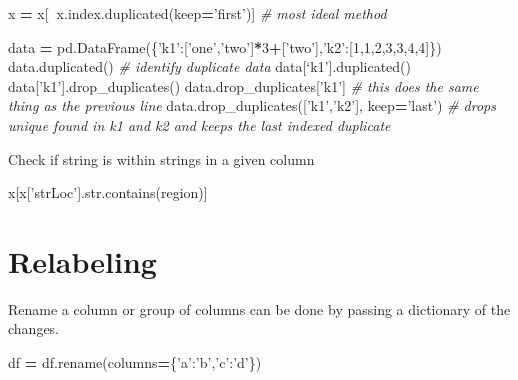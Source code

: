 \documentclass[]{book}
\newenvironment{Shaded}{\begin{snugshade}}{\end{snugshade}}
\newcommand{\DecValTok}[1]{\textcolor[rgb]{0.00,0.00,0.81}{#1}}
\newcommand{\StringTok}[1]{\textcolor[rgb]{0.31,0.60,0.02}{#1}}
\newcommand{\CommentTok}[1]{\textcolor[rgb]{0.56,0.35,0.01}{\textit{#1}}}
\newcommand{\OperatorTok}[1]{\textcolor[rgb]{0.81,0.36,0.00}{\textbf{#1}}}
\newcommand{\BuiltInTok}[1]{#1}
\newcommand{\NormalTok}[1]{#1}
\begin{document}
\begin{Shaded}
\begin{Highlighting}[]
\NormalTok{x }\OperatorTok{=}\NormalTok{ x[}\OperatorTok{~}\NormalTok{x.index.duplicated(keep}\OperatorTok{=}\StringTok{'first'}\NormalTok{)] }\CommentTok{# most ideal method}

\NormalTok{data }\OperatorTok{=}\NormalTok{ pd.DataFrame(\{}\StringTok{'k1'}\NormalTok{:[}\StringTok{'one'}\NormalTok{,}\StringTok{'two'}\NormalTok{]}\OperatorTok{*}\DecValTok{3}\OperatorTok{+}\NormalTok{[}\StringTok{'two'}\NormalTok{],}\StringTok{'k2'}\NormalTok{:[}\DecValTok{1}\NormalTok{,}\DecValTok{1}\NormalTok{,}\DecValTok{2}\NormalTok{,}\DecValTok{3}\NormalTok{,}\DecValTok{3}\NormalTok{,}\DecValTok{4}\NormalTok{,}\DecValTok{4}\NormalTok{]\})}
\NormalTok{data.duplicated() }\CommentTok{# identify duplicate data}
\NormalTok{data[‘k1’].duplicated()}
\NormalTok{data[}\StringTok{'k1'}\NormalTok{].drop_duplicates()}
\NormalTok{data.drop_duplicates[}\StringTok{'k1'}\NormalTok{] }\CommentTok{# this does the same thing as the previous line}
\NormalTok{data.drop_duplicates([}\StringTok{'k1'}\NormalTok{,}\StringTok{'k2'}\NormalTok{], keep}\OperatorTok{=}\StringTok{'last'}\NormalTok{) }\CommentTok{# drops unique found in k1 and k2 and keeps the last indexed duplicate}
\end{Highlighting}
\end{Shaded}

Check if string is within strings in a given column

\begin{Shaded}
\begin{Highlighting}[]
\NormalTok{x[x[}\StringTok{'strLoc'}\NormalTok{].}\BuiltInTok{str}\NormalTok{.contains(region)]}
\end{Highlighting}
\end{Shaded}

\section{Relabeling}\label{relabeling}

Rename a column or group of columns can be done by passing a dictionary
of the changes.

\begin{Shaded}
\begin{Highlighting}[]
\NormalTok{    df }\OperatorTok{=}\NormalTok{ df.rename(columns}\OperatorTok{=}\NormalTok{\{}\StringTok{'a'}\NormalTok{:}\StringTok{'b'}\NormalTok{,}\StringTok{'c'}\NormalTok{:}\StringTok{'d'}\NormalTok{\})}
\end{Highlighting}
\end{Shaded}
\end{document}
